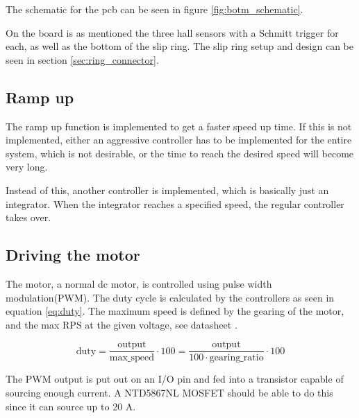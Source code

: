 The schematic for the pcb can be seen in figure \ref{fig:botm_schematic}.

On the board is as mentioned the three hall sensors with a Schmitt trigger for each, as well as the bottom of the slip ring. The slip ring setup and design can be seen in section \ref{sec:ring_connector}. 


\subsection{Ramp up}

The ramp up function is implemented to get a faster speed up time.
If this is not implemented, either an aggressive controller has to be implemented for the entire system, which is not desirable, or the time to reach the desired speed will become very long.

Instead of this, another controller is implemented, which is basically just an integrator.
When the integrator reaches a specified speed, the regular controller takes over. 


\subsection{Driving the motor}

The motor, a normal dc motor, is controlled using pulse width modulation(PWM). The duty cycle is calculated by the controllers as seen in equation \ref{eq:duty}. The maximum speed is defined by the gearing of the motor, and the max RPS at the given voltage, see datasheet \cite{datasheet:motor}. 

\begin{equation}\label{eq:duty}
 \text{duty} = \frac{\text{output}}{\text{max\_speed}}\cdot 100 = \frac{\text{output}}{100\cdot \text{gearing\_ratio}}\cdot 100
\end{equation}

The PWM output is put out on an I/O pin and fed into a transistor capable of sourcing enough current.
A NTD5867NL MOSFET should be able to do this since it can source up to 20 A\cite{datasheet:mosfet}.
